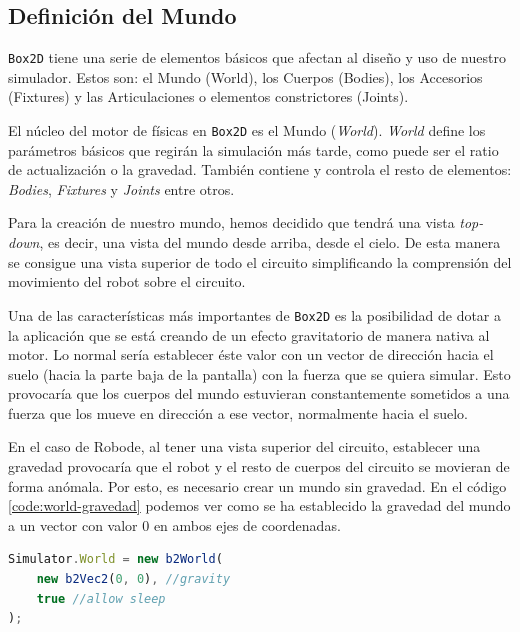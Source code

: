 \subsection{Definición del Mundo}

\texttt{Box2D} tiene una serie de elementos básicos que afectan al diseño y uso de nuestro simulador. Estos son: el Mundo (World), los Cuerpos (Bodies), los Accesorios (Fixtures) y las Articulaciones o elementos constrictores (Joints).

El núcleo del motor de físicas en \texttt{Box2D} es el Mundo (\emph{World}). \emph{World} define los parámetros básicos que regirán la simulación más tarde, como puede ser el ratio de actualización o la gravedad. También contiene y controla el resto de elementos: \emph{Bodies}, \emph{Fixtures} y \emph{Joints} entre otros.



Para la creación de nuestro mundo, hemos decidido que tendrá una vista \emph{top-down}, es decir, una vista del mundo desde arriba, desde el cielo. De esta manera se consigue una vista superior de todo el circuito simplificando la comprensión del movimiento del robot sobre el circuito.

Una de las características más importantes de \texttt{Box2D} es la posibilidad de dotar a la aplicación que se está creando de un efecto gravitatorio de manera nativa al motor. Lo normal sería establecer éste valor con un vector de dirección hacia el suelo (hacia la parte baja de la pantalla) con la fuerza que se quiera simular. Esto provocaría que los cuerpos del mundo estuvieran constantemente sometidos a una fuerza que los mueve en dirección a ese vector, normalmente hacia el suelo.  

En el caso de Robode, al tener una vista superior del circuito, establecer una gravedad provocaría que el robot y el resto de cuerpos del circuito se movieran de forma anómala. Por esto, es necesario crear un mundo sin gravedad. En el código \ref{code:world-gravedad} podemos ver como se ha establecido la gravedad del mundo a un vector con valor 0 en ambos ejes de coordenadas. 

\begin{lstlisting}[language={Javascript},label={code:world-gravedad}, caption={Definición del objeto \texttt{World} en Box2D con gravedad 0 y permitiendo que los cuerpos sean capaces de dormir.}]
Simulator.World = new b2World(
	new b2Vec2(0, 0), //gravity
	true //allow sleep
);
\end{lstlisting}

